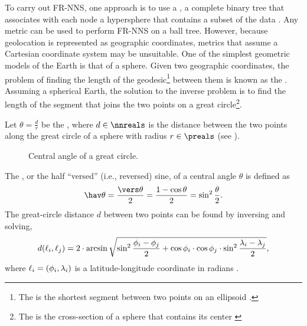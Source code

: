 To carry out FR-NNS, one approach is to use a , a complete binary tree that associates with each node a hypersphere that contains a subset of the data \cite{Omohundro1989, Neeraj2008, Kibriya2007}. Any metric can be used to perform FR-NNS on a ball tree. However, because geolocation is represented as geographic coordinates, metrics that assume a Cartesian coordinate system may be unsuitable. One of the simplest geometric models of the Earth is that of a sphere. Given two geographic coordinates, the problem of finding the length of the geodesic\footnote{The  is the shortest segment between two points on an ellipsoid \cite[p. 204]{Lu2014}.} between them is known as the  \cite{Sjoberg2012}. Assuming a spherical Earth, the solution to the inverse problem is to find the length of the segment that joins the two points on a great circle\footnote{The  is the cross-section of a sphere that contains its center \cite[p. 165]{Lu2014}}.

Let $\theta = \frac{d}{r}$ be the , where $d \in \nnreals$ is the distance between the two points along the great circle of a sphere with radius $r \in \preals$ (see ).
	\def\myrad{2.25cm}%
	\def\myang{60}%
	\begin{figure}[ht!]
	\centering
	\caption[Central angle of a great circle]{Central angle of a great circle.}
	\label{fig:central-angle}
	\end{figure}
The , or the half ``versed'' (i.e., reversed) sine, of a central angle $\theta$ is defined as
	\begin{equation}
		\hav \theta = \frac{\vers \theta}{2}  = \frac{1 - \cos \theta}{2}= \sin^2 \frac{\theta}{2}. \label{eq:hav}
	\end{equation}
The great-circle distance $d$ between two points can be found by inversing  and solving,
	\begin{equation*}
		d(\ell_i, \ell_j) = 2 \cdot \arcsin \sqrt{\sin^2 \frac{\phi_i - \phi_j}{2} + \cos \phi_i \cdot \cos\phi_j \cdot \sin^2 \frac{\lambda_i - \lambda_j}{2}},
	\end{equation*}
where $\ell_i = (\phi_i, \lambda_i)$ is a latitude-longitude coordinate in radians \cite[pp. 157--162]{Brummelen2013}.

